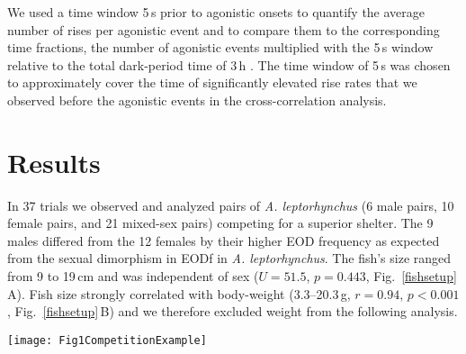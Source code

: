 \documentclass[vruler,JEB]{COB}%
\newcommand{\lepto}{\textit{A. leptorhynchus}}
\newcommand{\figitem}[1]{\textsf{\bfseries\uppercase{#1}}\penalty10000 }
\newcommand{\panel}[1]{\textsf{#1}}
\newcommand{\subfref}[2]{\textup{\ref{#1}}\,\panel{#2}}
\newcommand{\Figb}{Fig.}
\newcommand{\Subfigrefb}[2]{\Figb~\subfref{#1}{#2}}
\begin{document}
We used a time window 5\,s prior to agonistic onsets to quantify the average number of rises per agonistic event and to compare them to the corresponding time fractions, the number of agonistic events multiplied with the 5\,s window relative to the total dark-period time of 3\,h . The time window of 5\,s was chosen to approximately cover the time of significantly elevated rise rates that we observed before the agonistic events in the cross-correlation analysis.


\section{Results}   %

In 37 trials we observed and analyzed pairs of \lepto{} (6 male pairs, 10 female pairs, and 21 mixed-sex pairs) competing for a superior shelter. The 9 males differed from the 12 females by their higher EOD frequency as expected from the sexual dimorphism in EODf in \lepto{}. The fish's size ranged from 9 to 19\,cm and was independent of sex ($U=51.5$, $p=0.443$, \Subfigrefb{fishsetup}{A}). Fish size strongly correlated with body-weight (3.3--20.3\,g, $r=0.94$, $p<0.001$, \Subfigrefb{fishsetup}{B}) and we therefore excluded weight from the following analysis.

\begin{figure*}[!h]

\centerline{\texttt{[image: Fig1CompetitionExample]}}
\caption{Behaviors and interactions of \lepto{} during a typical competition trial. \figitem{A} Spectrogram of an electric recording comprising the EODf trace of a fish while emitting a rise as communication signal. Rises are abrupt increases in EODf followed by an exponential decay back to baseline EODf. Rises were detected using their characteristic onset peak (black triangle). \figitem{B} Spectrogram of a 200\,second snipped of a electric recording comprising EODf traces of two fish. In the lower EODf trace a series of 10 rises can be seen. \figitem{C, D} Ritualized agonistic interactions in \lepto{} comprise non-physical chasing (panel~\panel{C}) and short physical agonistic interactions like biting or head bumping (panel~\panel{D}). Both were initiated by fish later winning a trial. \figitem{E} \lepto{} continuously emits EODs with an individual specific frequency. EODf traces of both competing fish (blue male and green female, bottom panel), time points of physical contacts, onsets of chasing behavior, and detected rises (top panels) recorded during the full 6\,h trial with the first 3\,h in darkness (gray) and the last 3\,h during light.}
\label{trial}
\end{figure*}
\end{document}
